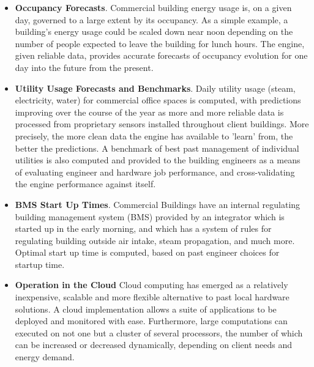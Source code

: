 \documentclass[12pt]{article}
\begin{document}
\begin{itemize}
	\item{\textbf{Occupancy Forecasts}}. Commercial building energy usage is, on a given
		day, governed to a large extent by its occupancy. As a simple example, 
		a building's energy usage could be scaled down near noon depending on 
		the number of people expected to leave the building for lunch hours. The
		engine, given reliable data, provides accurate forecasts of occupancy
		evolution for one day into the future from the present. 
	
	\item{\textbf{Utility Usage Forecasts and Benchmarks}}. Daily utility usage (steam,
		electricity, water) for commercial
		office spaces is computed, with predictions improving over the course of the
		year as more and more reliable
		data is processed from proprietary sensors installed throughout client
		buildings. More precisely, the more clean data the engine has available to 'learn'
		from, the better the predictions.
		A benchmark of best past management of individual utilities is also computed
		and provided to the building engineers as a means of evaluating 
		engineer and hardware job performance, and cross-validating the engine
		performance against itself. 

	\item{\textbf{BMS Start Up Times}}. Commercial Buildings have an internal
		regulating building management system (BMS) provided by an integrator which is started up in the early morning, and which has
		a system of rules for regulating building outside air intake, steam
		propagation, and much more.  Optimal start up time is computed, based on
		past engineer choices for startup time. 
	
	\item{\textbf{Operation in the Cloud}} Cloud computing has emerged as a
		relatively inexpensive, scalable and more flexible
		alternative to past local hardware solutions. 
		A cloud implementation allows a suite of applications to be deployed
		and monitored with ease. Furthermore, large computations can executed on not
		one but a cluster of several processors, 
		the number of which can be increased or decreased
		dynamically, depending on client needs and energy demand. 

\end{itemize}
\end{document}
